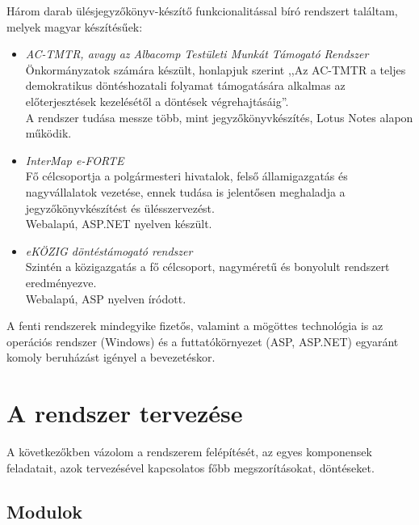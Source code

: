 \documentclass[a4paper,12pt,oneside]{report}
\begin{document}
Három darab ülésjegyzőkönyv-készítő funkcionalitással bíró rendszert találtam, melyek magyar készítésűek:

\begin{itemize}

    \item \emph{AC-TMTR, avagy az Albacomp Testületi Munkát Támogató Rendszer}\cite{website:actmtr}\\
    Önkormányzatok számára készült, honlapjuk szerint ,,Az AC-TMTR a teljes demokratikus döntéshozatali folyamat támogatására alkalmas az előterjesztések kezelésétől a döntések végrehajtásáig''.\\
    A rendszer tudása messze több, mint jegyzőkönyvkészítés, Lotus Notes alapon működik.
    
    \item \emph{InterMap e-FORTE}\cite{website:eforte}\\
    Fő célcsoportja a polgármesteri hivatalok, felső államigazgatás és nagyvállalatok vezetése, ennek tudása is jelentősen meghaladja a jegyzőkönyvkészítést és ülésszervezést.\\
    Webalapú, ASP.NET nyelven készült.
    
    \item \emph{eKÖZIG döntéstámogató rendszer}\cite{website:ekozig}\\
    Szintén a közigazgatás a fő célcsoport, nagyméretű és bonyolult rendszert eredményezve.\\
    Webalapú, ASP nyelven íródott.
    
\end{itemize}

A fenti rendszerek mindegyike fizetős, valamint a mögöttes technológia is \textendash{} az operációs rendszer (Windows) és a futtatókörnyezet (ASP, ASP.NET) egyaránt komoly beruházást igényel a bevezetéskor.


\section{A rendszer tervezése}

A következőkben vázolom a rendszerem felépítését, az egyes komponensek feladatait, azok tervezésével kapcsolatos főbb megszorításokat, döntéseket.

\subsection{Modulok}
\end{document}
